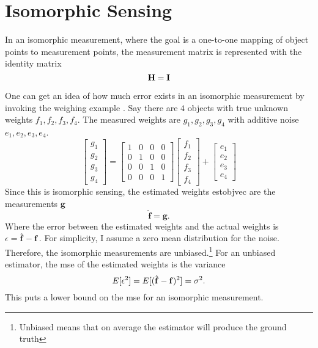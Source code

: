 \section{Isomorphic Sensing}

In an isomorphic measurement, where the goal is a one-to-one mapping of object points to measurement points, the measurement matrix is represented with the identity matrix
\begin{equation}
	\mathbf{H}=\mathbf{I}	
\end{equation}

One can get an idea of how much error exists in an isomorphic measurement by invoking the weighing example \cite{harwit2012hadamard}. Say there are $4$ objects with true unknown weights $f_{1}, f_{2}, f_{3}, f_{4}$. The measured weights are $g_{1}, g_{2}, g_{3}, g_{4}$ with additive noise  $ e_1, e_2, e_3, e_4 $. 
\begin{equation}
	\left[ \begin{matrix} g_1\\ g_2\\ g_3\\ g_4\end{matrix} \right] = \left[ \begin{matrix} 1& 0& 0& 0\\ 0& 1& 0& 0\\ 0& 0& 1& 0\\ 0& 0& 0& 1\end{matrix} \right] \left[ \begin{matrix} f_1\\ f_2\\ f_3\\ f_4\end{matrix} \right] + \left[ \begin{matrix} e_1\\ e_2\\ e_3\\ e_4\end{matrix} \right] 
	\label{eq:gHfpluse}
\end{equation}
Since this is \gls{isomorphic sensing}, the estimated weights \gls{estobjvec} are the measurements  $ \mathbf{g} $
\begin{equation}
	\mathbf{ \hat{ f }} = \mathbf{g}. 
\end{equation}
Where the error between the estimated weights and the actual weights is $ \mathbf{\epsilon} = \hat{ \mathbf{f} } - \mathbf{f} $. For simplicity, I assume a zero mean distribution for the noise. Therefore, the isomorphic measurements are unbiased.\footnote{Unbiased means that on average the estimator will produce the ground truth} For an unbiased estimator, the \gls{mse} of the estimated weights is the variance
\begin{equation}
	E [  \mathbf{\epsilon} ^2 ] = E [ ( \hat{ \mathbf{f} } - \mathbf{f} )^2 ] = \sigma^2.
\end{equation}
This puts a lower bound on the \gls{mse} for an isomorphic measurement. 

